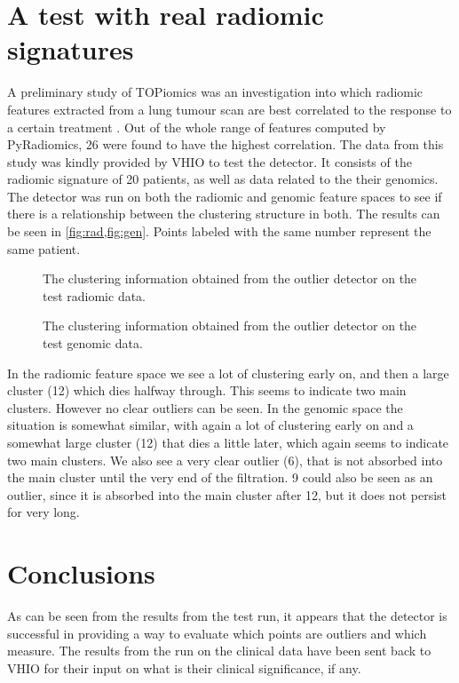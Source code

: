 \documentclass[../main.tex]{subfiles}
\begin{document}
\section{A test with real radiomic signatures}
A preliminary study of TOPiomics was an investigation into which radiomic features
extracted from a lung tumour scan are best correlated to the response to a certain
treatment \cite{features}. Out of the whole range of features computed by
\textsf{PyRadiomics}, 26 were found to have the highest correlation. The data from this
study was kindly provided by VHIO to test the detector. It consists of the radiomic
signature of 20 patients, as well as data related to the their genomics. The detector was
run on both the radiomic and genomic feature spaces to see if there is a relationship
between the clustering structure in both. The results can be seen in
\cref{fig:rad,fig:gen}. Points labeled with the same number represent the same patient. 
\begin{figure}[p]
	\centering \small \sffamily
	
	\caption{The clustering information obtained from the outlier detector on the test
	radiomic data.}
	\label{fig:rad}
\end{figure}

\begin{figure}[p]
	\centering \small \sffamily
	
	\caption{The clustering information obtained from the outlier detector on the test
	genomic data.}
	\label{fig:gen}
\end{figure}

In the radiomic feature space we see a lot of clustering early on, and then a large
cluster (12) which dies halfway through. This seems to indicate two main clusters. However no
clear outliers can be seen. In the genomic space the situation is somewhat similar, with
again a lot of clustering early on and a somewhat large cluster (12) that dies a little later,
which again seems to indicate two main clusters. We also see a very clear outlier (6),
that is not absorbed into the main cluster until the very end of the filtration. 9 could
also be seen as an outlier, since it is absorbed into the main cluster after 12, but it
does not persist for very long.

\section{Conclusions}
As can be seen from the results from the test run, it appears that the detector is
successful in providing a way to evaluate which points are outliers and which measure. The
results from the run on the clinical data have been sent back to VHIO for their input on
what is their clinical significance, if any. 
\end{document}
